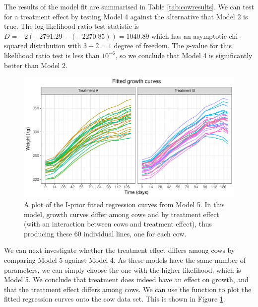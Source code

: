 \documentclass[a4paper,showframe,11pt]{report}\usepackage[]{graphicx}\usepackage[]{color}
\newenvironment{knitrout}{}{} %
\begin{document}
The results of the model fit are summarised in Table \ref{tab:cowresults}. We can test for a treatment effect by testing Model 4 against the alternative that Model 2 is true. The log-likelihood ratio test statistic is $D = -2(-2791.29 - (-2270.85)) = 1040.89$ which has an asymptotic chi-squared distribution with $3 - 2 = 1$ degree of freedom. The $p$-value for this likelihood ratio test is less than $10^{-6}$, so we conclude that Model 4 is significantly better than Model 2.

\begin{knitrout}
\color{fgcolor}\begin{figure}[h]

{\centering \includegraphics[width=\linewidth]{figure/cow_plot-1} 

}

\caption[A plot of the I-prior fitted regression curves from Model 5]{A plot of the I-prior fitted regression curves from Model 5. In this model, growth curves differ among cows and by treatment effect (with an interaction between cows and treatment effect), thus producing these 60 individual lines, one for each cow.}\label{fig:cow_plot}
\end{figure}


\end{knitrout}

We can next investigate whether the treatment effect differs among cows by comparing Model 5 against Model 4. As these models have the same number of parameters, we can simply choose the one with the higher likelihood, which is Model 5. We conclude that treatment does indeed have an effect on growth, and that the treatment effect differs among cows. We can use the  function to plot the fitted regression curves onto the cow data set. This is shown in Figure \ref{fig:cow_plot}.
\end{document}

